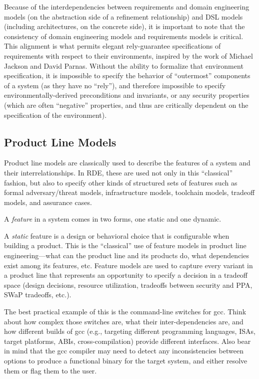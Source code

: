 \documentclass[10pt,letterpaper]{article}
\begin{document}
Because of the interdependencies between requirements and domain engineering models (on the abstraction side of a refinement relationship) and DSL models (including architectures, on the concrete side), it is important to note that the consistency of domain engineering models and requirements models is critical. This alignment is what permits elegant rely-guarantee specifications of requirements with respect to their environments, inspired by the work of Michael Jackson and David Parnas. Without the ability to formalize that environment specification, it is impossible to specify the behavior of ``outermost'' components of a system (as they have no ``rely''), and therefore impossible to specify environmentally-derived preconditions and invariants, or any security properties (which are often ``negative'' properties, and thus are critically dependent on the specification of the environment).

\subsection{Product Line Models}
\label{product-line-models}

Product line models are classically used to describe the features of a system and their interrelationships. In RDE, these are used not only in this ``classical'' fashion, but also to specify other kinds of structured sets of features such as formal adversary/threat models, infrastructure models, toolchain models, tradeoff models, and assurance cases.

A \emph{feature} in a system comes in two forms, one static and one dynamic.

A \emph{static} feature is a design or behavioral choice that is configurable when building a product. This is the ``classical'' use of feature models in product line engineering---what can the product line and its products do, what dependencies exist among its features, etc. Feature models are used to capture every variant in a product line that represents an opportunity to specify a decision in a tradeoff space (design decisions, resource utilization, tradeoffs between security and PPA, SWaP tradeoffs, etc.).

The best practical example of this is the command-line switches for gcc. Think about how complex those switches are, what their inter-dependencies are, and how different builds of gcc (e.g., targeting different programming languages, ISAs, target platforms, ABIs, cross-compilation) provide different interfaces. Also bear in mind that the gcc compiler may need to detect any inconsistencies between options to produce a functional binary for the target system, and either resolve them or flag them to the user.
\end{document}
